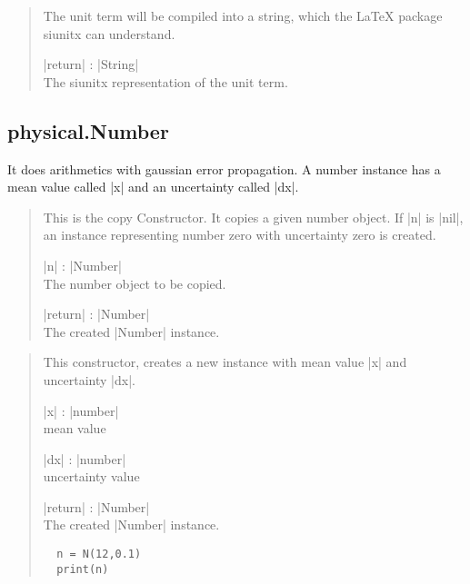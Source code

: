 \documentclass{ltxdoc}
\begin{document}
\begin{quote}
  The unit term will be compiled into a string, which the LaTeX package siunitx can understand.

  \subtitle{Parameters}
  \begin{description}
  \item |return| : |String|\\
    The siunitx representation of the unit term.
  \end{description}

\end{quote}




%
%
\subsection{physical.Number}

It does arithmetics with gaussian error propagation. A number instance has a mean value called |x| and an uncertainty called |dx|.

\begin{quote}
  This is the copy Constructor. It copies a given number object. If |n| is |nil|, an instance representing number zero with uncertainty zero is created.

  \subtitle{Parameters}
  \begin{description}
  \item |n| : |Number|\\
    The number object to be copied.

  \item |return| : |Number|\\
    The created |Number| instance.
  \end{description}

\end{quote}


\begin{quote}
  This constructor, creates a new instance with mean value |x| and uncertainty |dx|.

  \subtitle{Parameters}
  \begin{description}
  \item |x| : |number|\\
    mean value

  \item |dx| : |number|\\
    uncertainty value

  \item |return| : |Number|\\
    The created |Number| instance.
  \end{description}

  \subtitle{Examples}
  \begin{lstlisting}
  n = N(12,0.1)
  print(n)
  \end{lstlisting}

\end{quote}
\end{document}
